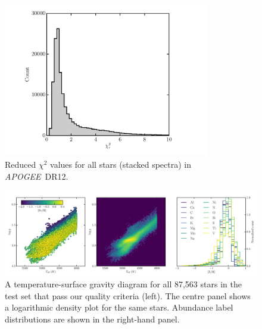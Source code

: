 \documentclass[12pt,preprint]{aastex6}
\newcommand{\project}[1]{\textsl{#1}}
\newcommand{\acronym}[1]{{\small{#1}}}
\newcommand{\apogee}{\project{\acronym{APOGEE}}}
\newcommand{\dr}{\acronym{DR12}}
\begin{document}
\begin{figure}[p]
\centering
\includegraphics[width=0.8\textwidth]{test-step-chisq.pdf}
\caption{Reduced $\chi^2$ values for all stars (stacked spectra) in \apogee\ \dr.\label{fig:chisq-test set}}
\end{figure}

\clearpage

\begin{figure}[p]
\includegraphics[width=\textwidth]{test_set_hrd.pdf}
\caption{A temperature-surface gravity diagram for all 87,563 stars in the test set that pass our quality criteria (left). The centre panel shows a logarithmic density plot for the same stars. Abundance label distributions are shown in the right-hand panel.\label{fig:test set-hrd}}
\end{figure}

\clearpage
\end{document}
